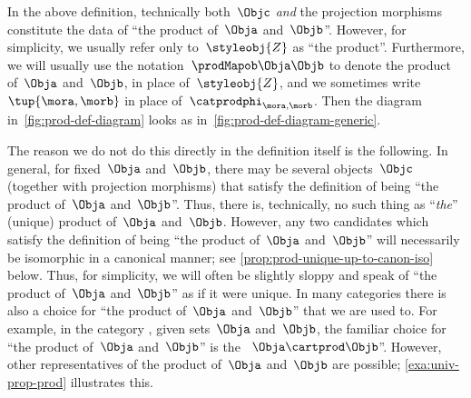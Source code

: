 \begin{remark}
    \label{prod unique up to iso}
    In the above definition, technically both~$\Objc$ \emph{and} the projection morphisms constitute the data of ``the product of~$\Obja$ and~$\Objb$''.
    However, for simplicity, we usually refer only to~$\styleobj{Z}$ as ``the product''.
    Furthermore, we will usually use the notation~$\prodMapob\Obja\Objb$ to denote the product of~$\Obja$ and~$\Objb$, in place of~$\styleobj{Z}$, and we sometimes write~$\tup{\mora,\morb}$ in place of~$\catprodphi_{\mora, \morb}$.
    Then the diagram in~\cref{fig:prod-def-diagram} looks as in~\cref{fig:prod-def-diagram-generic}.

    The reason we do not do this directly in the definition itself is the following.
    In general, for fixed~$\Obja$ and~$\Objb$, there may be several objects~$\Objc$ (together with projection morphisms) that satisfy the definition of being ``the product of~$\Obja$ and~$\Objb$''.
    Thus, there is, technically, no such thing as ``\emph{the}'' (unique) product of~$\Obja$ and~$\Objb$.
    However, any two candidates which satisfy the definition of being ``the product of~$\Obja$ and~$\Objb$'' will necessarily be isomorphic in a canonical manner; see \cref{prop:prod-unique-up-to-canon-iso} below.
    Thus, for simplicity, we will often be slightly sloppy and speak of ``the product of~$\Obja$ and~$\Objb$'' as if it were unique.
    In many categories there is also a choice for ``the product of~$\Obja$ and~$\Objb$'' that we are used to.
    For example, in the category \Set, given sets~$\Obja$ and~$\Objb$, the familiar choice for ``the product of~$\Obja$ and~$\Objb$'' is the ~$\Obja \cartprod \Objb$''.
    However, other representatives of the product of~$\Obja$ and~$\Objb$ are possible; \cref{exa:univ-prop-prod} illustrates this.
\end{remark}


